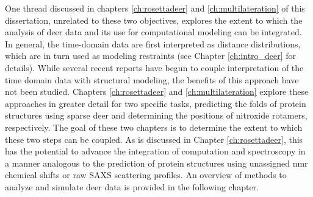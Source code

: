 One thread discussed in chapters \ref{ch:rosettadeer} and \ref{ch:multilateration} of this dissertation, unrelated to these two objectives, explores the extent to which the analysis of \gls{deer} data and its use for computational modeling can be integrated. In general, the time-domain data are first interpreted as distance distributions, which are in turn used as modeling restraints (see Chapter \ref{ch:intro_deer} for details). While several recent reports have begun to couple interpretation of the time domain data with structural modeling, the benefits of this approach have not been studied. Chapters \ref{ch:rosettadeer} and \ref{ch:multilateration} explore these approaches in greater detail for two specific tasks, predicting the folds of protein structures using sparse \gls{deer} and determining the positions of nitroxide rotamers, respectively. The goal of these two chapters is to determine the extent to which these two steps can be coupled. As is discussed in Chapter \ref{ch:rosettadeer}, this has the potential to advance the integration of computation and spectroscopy in a manner analogous to the prediction of protein structures using unassigned \gls{nmr} chemical shifts or raw SAXS scattering profiles. An overview of methods to analyze and simulate \gls{deer} data is provided in the following chapter. %

